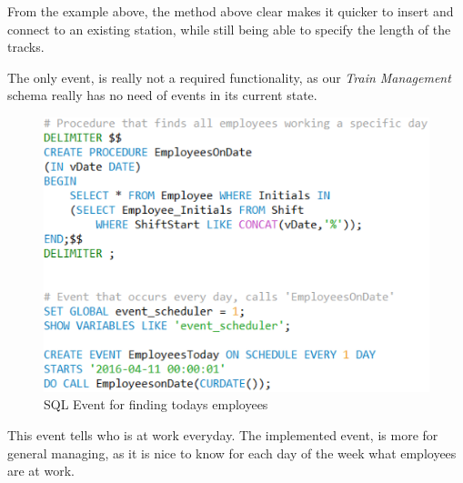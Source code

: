 From the example above, the method above clear makes it quicker to insert and connect to an existing station, while still being able to specify the length of the tracks.

\newpage
The only event, is really not a required functionality, as our \emph{Train 
Management} schema really has no need of events in its current state. 

\begin{figure}[ht!]
    \centering
    \includegraphics[width=1\textwidth]{img/SQL_EVENT}
    \caption{SQL Event for finding todays employees}
\end{figure}

This event tells who is at work everyday.
The implemented event, is more for general managing, as it is nice to know for 
each day of the week what employees are at work.
